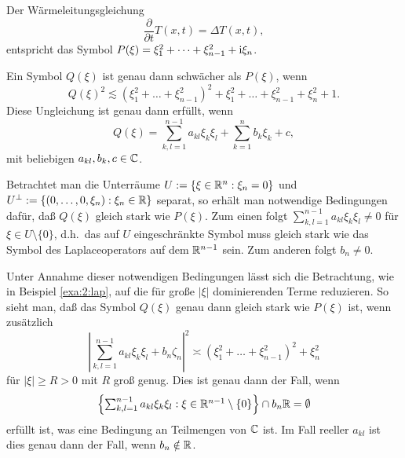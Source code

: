 \begin{exa}\label{exa:2:heat}
Der Wärmeleitungsgleichung
\begin{equation}
\frac{\partial}{\partial t}T(x,t)=\Delta T(x,t),
\end{equation}
entspricht das Symbol $P(\xi)=\xi^2_1+\dots+\xi^2_{n-1}+\mathrm i\xi_n$.

Ein Symbol $Q(\xi)$ ist genau dann schwächer als $P(\xi)$, wenn
\begin{equation}
Q(\xi)^2\apprle(\xi^2_1+\dots+\xi^2_{n-1})^2+\xi^2_1+\dots+\xi^2_{n-1}+\xi^2_n+1.
\end{equation}
Diese Ungleichung ist genau dann erfüllt, wenn
\begin{equation}
Q(\xi)=\sum_{k,l=1}^{n-1}a_{kl}\xi_k\xi_l+\sum_{k=1}^nb_k\xi_k+c,
\end{equation}
mit beliebigen $a_{kl},b_k,c\in\mathbb C$.

Betrachtet man die Unterräume $U:=\{\xi\in\mathbb R^n:\xi_n=0\}$
und $U^\perp:=\{(0,\dots,0,\xi_n):\xi_n\in\mathbb R\}$ separat,
so erhält man notwendige Bedingungen dafür,
daß $Q(\xi)$ gleich stark wie $P(\xi)$.
Zum einen folgt $\sum^{n-1}_{k,l=1}a_{kl}\xi_k\xi_l\neq0$ für $\xi\in U\setminus\{0\}$,
d.h.~das auf $U$ eingeschränkte Symbol muss gleich stark
wie das Symbol des Laplaceoperators auf dem $\mathbb R^{n-1}$ sein.
Zum anderen folgt $b_n\neq0$.

Unter Annahme dieser notwendigen Bedingungen lässt sich
die Betrachtung, wie in Beispiel \ref{exa:2:lap},
auf die für große $|\xi|$ dominierenden Terme reduzieren.
So sieht man, daß das Symbol $Q(\xi)$ genau dann gleich stark wie $P(\xi)$ ist,
wenn zusätzlich
\begin{equation}
\left|\textstyle\sum^{n-1}_{k,l=1}a_{kl}\xi_k\xi_l+b_n\zeta_n\right|^2
\asymp(\xi_1^2+\dots+\xi_{n-1}^2)^2+\xi_n^2
\end{equation}
für $|\xi|\geq R>0$ mit $R$ groß genug.
Dies ist genau dann der Fall, wenn
\begin{equation}
\left\{\textstyle\sum^{n-1}_{k,l=1}a_{kl}\xi_k\xi_l:\xi\in\mathbb R^{n-1}\setminus\{0\}\right\}
\cap b_n\mathbb R=\emptyset
\end{equation}
erfüllt ist, was eine Bedingung an Teilmengen von $\mathbb C$ ist.
Im Fall reeller $a_{kl}$ ist dies genau dann der Fall,
wenn $b_n\notin\mathbb R$.
\end{exa}

